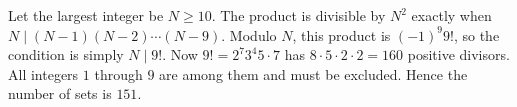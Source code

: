Let the largest integer be $N\ge10$. The product is divisible by $N^2$ exactly when $N\mid(N-1)(N-2)\cdots(N-9)$. Modulo $N$, this product is $(-1)^9 9!$, so the condition is simply $N\mid9!$. Now $9!=2^7 3^4 5\cdot7$ has $8\cdot5\cdot2\cdot2=160$ positive divisors. All integers $1$ through $9$ are among them and must be excluded. Hence the number of sets is $\boxed{151}$.
